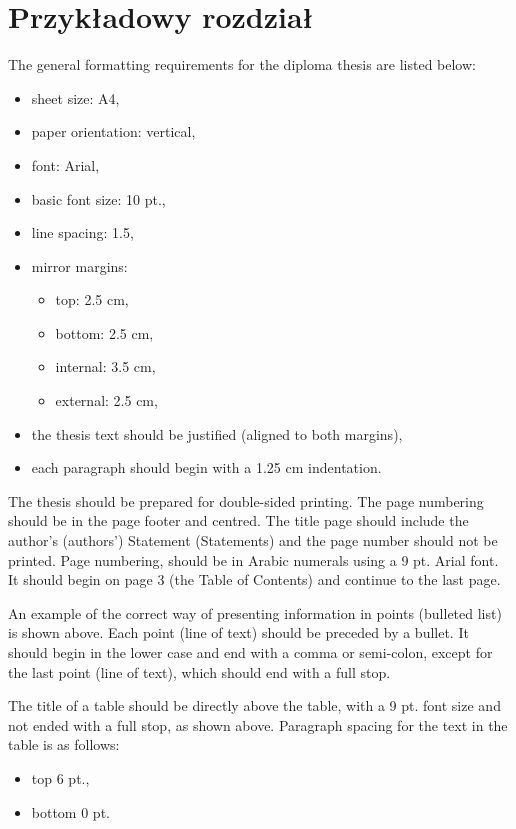 \chapter{Przykładowy rozdział}

The general formatting requirements for the diploma thesis are listed below:
\begin{itemize}
	\item sheet size: A4,
	\item paper orientation: vertical,
	\item font: Arial,
	\item basic font size: 10 pt.,
	\item line spacing: 1.5,
	\item mirror margins:
	\begin{itemize}
		\item top: 2.5 cm,
		\item bottom: 2.5 cm,
		\item internal: 3.5 cm,
		\item external: 2.5 cm,
	\end{itemize}
	\item the thesis text should be justified (aligned to both margins),
	\item each paragraph should begin with a 1.25 cm indentation.
\end{itemize}

The thesis should be prepared for double-sided printing. The page numbering should be in the page footer and centred. The title page should include the author’s (authors’) Statement (Statements) and the page number should not be printed. Page numbering, should be in Arabic numerals using a 9 pt. Arial font. It should begin on page 3 (the Table of Contents) and continue to the last page.

An example of the correct way of presenting information in points (bulleted list) is shown above. Each point (line of text) should be preceded by a bullet. It should begin in the lower case and end with a comma or semi-colon, except for the last point (line of text), which should end with a full stop.

The title of a table should be directly above the table, with a 9 pt. font size and not ended with a full stop, as shown above. Paragraph spacing for the text in the table is as follows:
\begin{itemize}
	\item top 6 pt.,
	\item bottom 0 pt.
\end{itemize}

